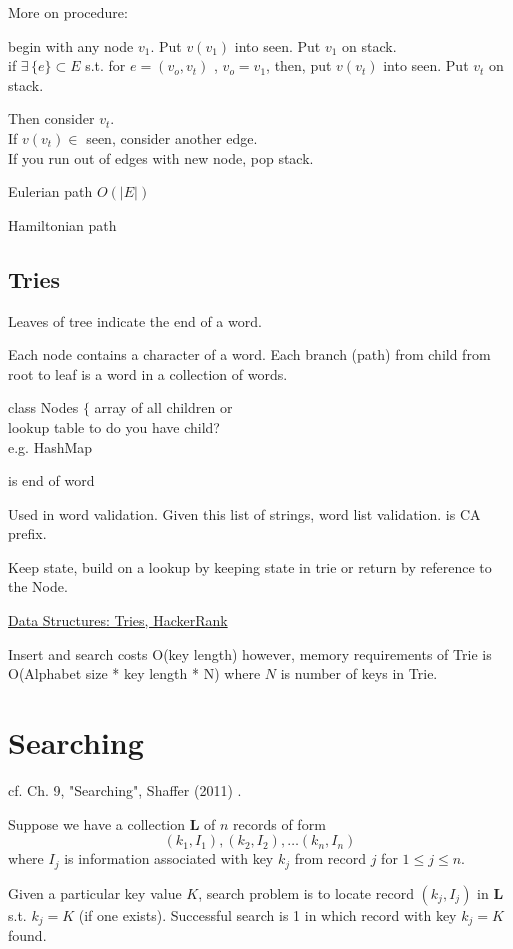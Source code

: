 \documentclass[10pt]{amsart}
\begin{document}
\begin{multicols*}{2}
More on procedure:

begin with any node $v_1$. Put $v(v_1)$ into seen. Put $v_1$ on stack. \\
if $\exists \, \lbrace e \rbrace \subset E$ s.t. for $e = (v_o, v_t)$ , $v_o = v_1$, then, put $v(v_t)$ into seen. Put $v_t$ on stack.

Then consider $v_t$. \\
If $v(v_t) \in $ seen, consider another edge. \\
If you run out of edges with new node, pop stack. 

Eulerian path $O(|E|) $ 

Hamiltonian path


\subsection{Tries}

Leaves of tree indicate the end of a word.

Each node contains a character of a word. Each branch (path) from child from root to leaf is a word in a collection of words. 

class Nodes $\lbrace $ array of all children or \\
lookup table to do you have child? \\
e.g. HashMap

is end of word

Used in word validation. Given this list of strings, word list validation.
is CA prefix.

Keep state, build on a lookup by keeping state in trie or return by reference to the Node.

\href{https://youtu.be/zIjfhVPRZCg}{Data Structures: Tries, HackerRank}

Insert and search costs O(key length) however, memory requirements of Trie is O(Alphabet size * key length * N) where $N$ is number of keys in Trie.

\section{Searching}

cf. Ch. 9, "Searching", Shaffer (2011) \cite{Shaf2011}.

Suppose we have a collection $\mathbf{L}$ of $n$ records of form
\[
(k_1, I_1), (k_2, I_2) , \dots (k_n, I_n)
\]
where $I_j$ is information associated with key $k_j$ from record $j$ for $1\leq j \leq n$.

Given a particular key value $K$, search problem is to locate record $(k_j, I_j)$ in $\mathbf{L}$ s.t. $k_j = K$ (if one exists). Successful search is 1 in which record with key $k_j = K$ found.





\end{multicols*}
\end{document}
